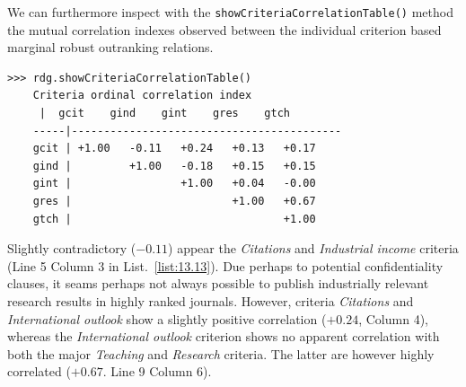 We can furthermore inspect with the \texttt{showCriteriaCorrelationTable()} method  the mutual correlation indexes observed between the individual criterion based marginal robust outranking relations. 
\begin{lstlisting}[caption={Showing the ordinal correlation between the marginal criterion relations},label=list:13.13]
>>> rdg.showCriteriaCorrelationTable()
    Criteria ordinal correlation index
	 |  gcit    gind    gint    gres    gtch   
    -----|------------------------------------------
    gcit | +1.00   -0.11   +0.24   +0.13   +0.17   
    gind |         +1.00   -0.18   +0.15   +0.15   
    gint |                 +1.00   +0.04   -0.00   
    gres |                         +1.00   +0.67   
    gtch |                                 +1.00   
\end{lstlisting}

Slightly contradictory ($-0.11$) appear the \emph{Citations} and \emph{Industrial income} criteria (Line 5 Column 3 in List.~\vref{list:13.13}). Due perhaps to potential confidentiality clauses, it seams perhaps not always possible to publish industrially relevant research results in highly ranked journals. However, criteria \emph{Citations} and \emph{International outlook} show a slightly positive correlation ($+0.24$, Column 4), whereas the \emph{International outlook} criterion shows no apparent correlation with both the major \emph{Teaching} and \emph{Research} criteria. The latter are however highly correlated ($+0.67$. Line 9 Column 6).

